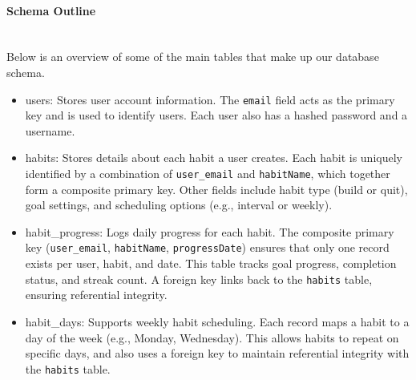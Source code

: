 \paragraph{Schema Outline}\mbox{}\\
Below is an overview of some of the main tables that make up our database schema.
\begin{itemize}

  \item {users}: Stores user account information. The \texttt{email} field acts as the primary key and is used to identify users. Each user also has a hashed password and a username.

  \item {habits}: Stores details about each habit a user creates. Each habit is uniquely identified by a combination of \texttt{user\_email} and \texttt{habitName}, which together form a composite primary key. Other fields include habit type (build or quit), goal settings, and scheduling options (e.g., interval or weekly).

  \item {habit\_progress}: Logs daily progress for each habit. The composite primary key (\texttt{user\_email}, \texttt{habitName}, \texttt{progressDate}) ensures that only one record exists per user, habit, and date. This table tracks goal progress, completion status, and streak count. A foreign key links back to the \texttt{habits} table, ensuring referential integrity.

\item {habit\_days}: Supports weekly habit scheduling. Each record maps a habit to a day of the week (e.g., Monday, Wednesday). This allows habits to repeat on specific days, and also uses a foreign key to maintain referential integrity with the \texttt{habits} table.

\end{itemize}

